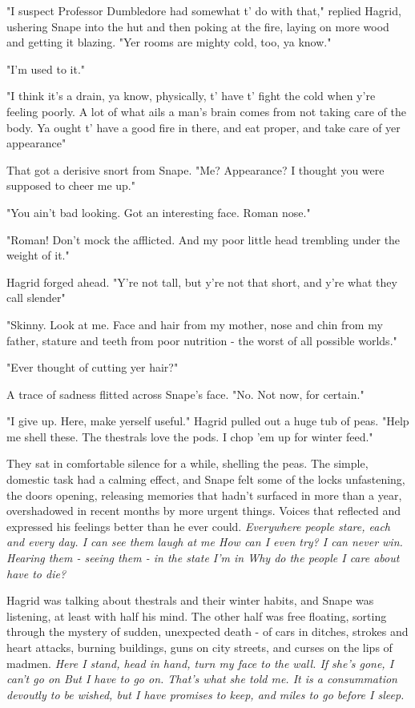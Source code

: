 "I suspect Professor Dumbledore had somewhat t' do with that," replied Hagrid, ushering Snape into the hut and then poking at the fire, laying on more wood and getting it blazing. "Yer rooms are mighty cold, too, ya know."

"I'm used to it."

"I think it's a drain, ya know, physically, t' have t' fight the cold when y're feeling poorly. A lot of what ails a man's brain comes from not taking care of the body. Ya ought t' have a good fire in there, and eat proper, and take care of yer appearance{\el}"

That got a derisive snort from Snape. "Me? Appearance? I thought you were supposed to cheer me up."

"You ain't bad looking. Got an interesting face. Roman nose."

"Roman! Don't mock the afflicted. And my poor little head trembling under the weight of it."

Hagrid forged ahead. "Y're not tall, but y're not that short, and y're what they call slender{\el}"

"Skinny. Look at me. Face and hair from my mother, nose and chin from my father, stature and teeth from poor nutrition - the worst of all possible worlds."

"Ever thought of cutting yer hair?"

A trace of sadness flitted across Snape's face. "No. Not now, for certain."

"I give up. Here, make yerself useful." Hagrid pulled out a huge tub of peas. "Help me shell these. The thestrals love the pods. I chop 'em up for winter feed."

They sat in comfortable silence for a while, shelling the peas. The simple, domestic task had a calming effect, and Snape felt some of the locks unfastening, the doors opening, releasing memories that hadn't surfaced in more than a year, overshadowed in recent months by more urgent things. Voices that reflected and expressed his feelings better than he ever could. \emph{Everywhere people stare, each and every day. I can see them laugh at me{\el} How can I even try? I can never win. Hearing them - seeing them - in the state I'm in{\el} Why do the people I care about have to die?}

Hagrid was talking about thestrals and their winter habits, and Snape was listening, at least with half his mind. The other half was free floating, sorting through the mystery of sudden, unexpected death - of cars in ditches, strokes and heart attacks, burning buildings, guns on city streets, and curses on the lips of madmen. \emph{Here I stand, head in hand, turn my face to the wall. If she's gone, I can't go on{\el} But I have to go on. That's what she told me. It is a consummation devoutly to be wished, but I have promises to keep, and miles to go before I sleep.}

